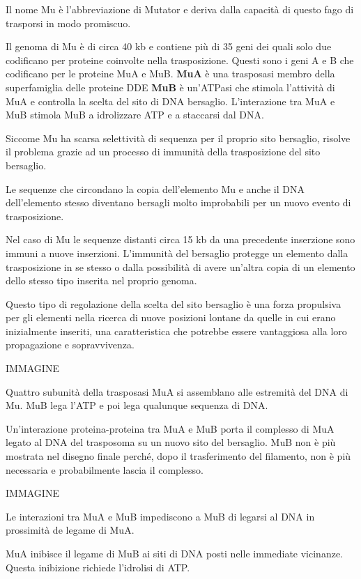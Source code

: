 \documentclass[11pt]{book}
\begin{document}
Il nome Mu è l'abbreviazione di Mutator e deriva dalla capacità di
questo fago di trasporsi in modo promiscuo.

Il genoma di Mu è di circa 40 kb e contiene più di 35 geni dei quali
solo due codificano per proteine coinvolte nella trasposizione. Questi
sono i geni A e B che codificano per le proteine MuA e MuB. \textbf{MuA}
è una trasposasi membro della superfamiglia delle proteine DDE
\textbf{MuB} è un'ATPasi che stimola l'attività di MuA e controlla la
scelta del sito di DNA bersaglio. L'interazione tra MuA e MuB stimola
MuB a idrolizzare ATP e a staccarsi dal DNA.

Siccome Mu ha scarsa selettività di sequenza per il proprio sito
bersaglio, risolve il problema grazie ad un processo di immunità della
trasposizione del sito bersaglio.

Le sequenze che circondano la copia dell'elemento Mu e anche il DNA
dell'elemento stesso diventano bersagli molto improbabili per un nuovo
evento di trasposizione.

Nel caso di Mu le sequenze distanti circa 15 kb da una precedente
inserzione sono immuni a nuove inserzioni. L'immunità del bersaglio
protegge un elemento dalla trasposizione in se stesso o dalla
possibilità di avere un'altra copia di un elemento dello stesso tipo
inserita nel proprio genoma.

Questo tipo di regolazione della scelta del sito bersaglio è una forza
propulsiva per gli elementi nella ricerca di nuove posizioni lontane da
quelle in cui erano inizialmente inseriti, una caratteristica che
potrebbe essere vantaggiosa alla loro propagazione e sopravvivenza.

IMMAGINE

Quattro subunità della trasposasi MuA si assemblano alle estremità del
DNA di Mu. MuB lega l'ATP e poi lega qualunque sequenza di DNA.

Un'interazione proteina-proteina tra MuA e MuB porta il complesso di MuA
legato al DNA del trasposoma su un nuovo sito del bersaglio. MuB non è
più mostrata nel disegno finale perché, dopo il trasferimento del
filamento, non è più necessaria e probabilmente lascia il complesso.

IMMAGINE

Le interazioni tra MuA e MuB impediscono a MuB di legarsi al DNA in
prossimità de legame di MuA.

MuA inibisce il legame di MuB ai siti di DNA posti nelle immediate
vicinanze. Questa inibizione richiede l'idrolisi di ATP.
\end{document}
